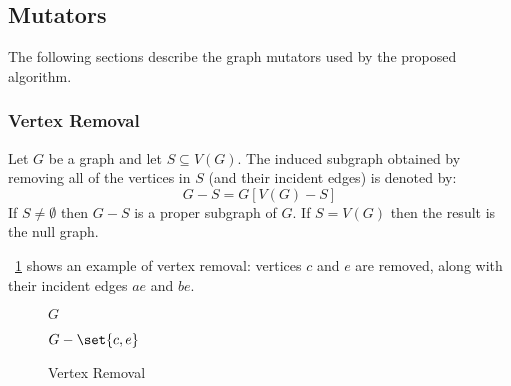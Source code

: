 \subsection{Mutators}\label{sec:sub:mutators}

The following sections describe the graph mutators used by the proposed algorithm.

\subsubsection{Vertex Removal}\label{sec:sub:sub:vremove}

Let \(G\) be a graph and let \(S\subseteq V(G)\).  The induced subgraph obtained by removing all of the vertices in
\(S\) (and their incident edges) is denoted by:
\[G-S=G[V(G)-S]\]
If \(S\ne\emptyset\) then \(G-S\) is a proper subgraph of \(G\).  If \(S=V(G)\) then the result is the null graph.

\figurename~\ref{fig:vremove} shows an example of vertex removal: vertices \(c\) and \(e\) are removed, along with
their incident edges \(ae\) and \(be\).

\begin{figure}[H]
  \label{fig:vremove}
  \begin{minipage}{3in}
    \begin{center}

      \bigskip

      \(G\)
    \end{center}
  \end{minipage}
  \begin{minipage}{3in}
    \begin{center}

      \bigskip

      \(G-\set{c,e}\)
    \end{center}
  \end{minipage}
  \caption{Vertex Removal}
\end{figure}

